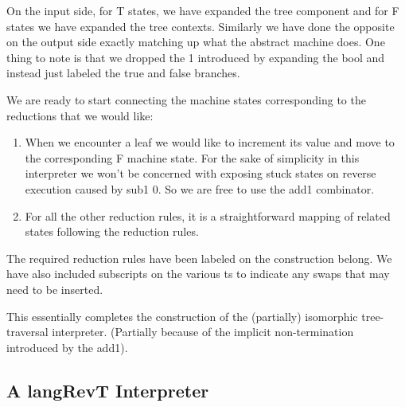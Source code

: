 \documentclass{llncs}
\begin{document}
On the input side, for {{T}} states, we have expanded the tree component and
for {{F}} states we have expanded the tree contexts. Similarly we have done
the opposite on the output side exactly matching up what the abstract machine
does. One thing to note is that we dropped the {{1}} introduced by expanding
the {{bool}} and instead just labeled the {{true}} and {{false}} branches.

We are ready to start connecting the machine states corresponding to
the reductions that we would like:
\begin{enumerate}
\item When we encounter a leaf we would like to increment its value and move
  to the corresponding {{F}} machine state. For the sake of simplicity in
  this interpreter we won't be concerned with exposing stuck states on
  reverse execution caused by {{sub1 0}}. So we are free to use the {{add1}}
  combinator.

\item For all the other reduction rules, it is a straightforward mapping of
  related states following the reduction rules.

\end{enumerate}

The required reduction rules have been labeled on the construction
belong. We have also included subscripts on the various {{t}}s to
indicate any swaps that may need to be inserted.

\begin{center}
\end{center}

This essentially completes the construction of the (partially)
isomorphic tree-traversal interpreter. (Partially because of the
implicit non-termination introduced by the {{add1}}).


\subsection{A {{langRevT}} Interpreter}

%
\end{document}

